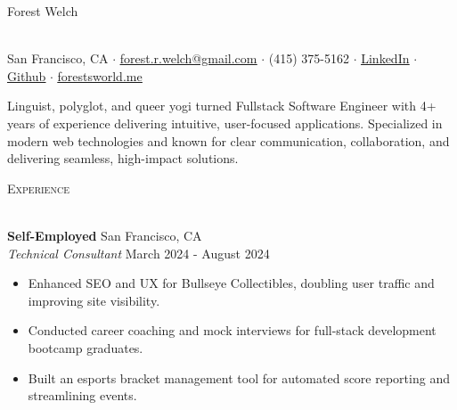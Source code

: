 \documentclass[a4paper]{article}
\newcommand{\header}[1]{
    {\hspace*{-18pt}\vspace*{3pt} \textcolor{deeppurple}{\textsc{#1}}}
    \vspace*{-12pt} \\
    \hspace*{-18pt} \textcolor{deeppurple}{\hrulefill} \\
}
\begin{document}
\vspace{-40pt}

\begin{center}
    \begin{minipage}{\textwidth}
        \centering
        {\fontsize{36}{36}\selectfont \textcolor{deeppurple}{Forest Welch}}
        \hspace{0.3cm}
    \end{minipage}
    \\ 
    \vspace{10pt}
    \small San Francisco, CA $\cdot$ \href{mailto:forest.r.welch@gmail.com}{\underline{forest.r.welch@gmail.com}} $\cdot$ (415) 375-5162 $\cdot$ \href{https://linkedin.com/in/forestrwelch}{\underline{LinkedIn}} $\cdot$ \href{https://github.com/nwelchr}{\underline{Github}} $\cdot$ \href{https://forestsworld.me/}{\underline{forestsworld.me}}
\end{center}

\begin{center}
    Linguist, polyglot, and queer yogi turned Fullstack Software Engineer with 4+ years of experience delivering intuitive, user-focused applications. Specialized in modern web technologies and known for clear communication, collaboration, and delivering seamless, high-impact solutions.
\end{center}

\header{Experience}
\vspace{1mm}

\textbf{Self-Employed} \hfill San Francisco, CA\\
\textit{Technical Consultant} \hfill March 2024 - August 2024\\
\vspace{-1mm}
\begin{itemize} \itemsep .5pt
    \item Enhanced SEO and UX for Bullseye Collectibles, doubling user traffic and improving site visibility.
    \item Conducted career coaching and mock interviews for full-stack development bootcamp graduates.
    \item Built an esports bracket management tool for automated score reporting and streamlining events.
\end{itemize}
\end{document}
